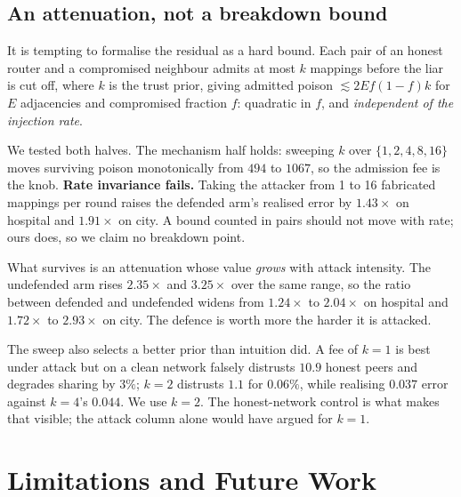 \documentclass[conference,a4paper]{IEEEtran}
\begin{document}
\subsection{An attenuation, not a breakdown bound}
\label{sec:threat-attenuation}

It is tempting to formalise the residual as a hard bound. Each pair of an
honest router and a compromised neighbour admits at most $k$ mappings before
the liar is cut off, where $k$ is the trust prior, giving admitted poison
$\lesssim 2Ef(1-f)k$ for $E$ adjacencies and compromised fraction $f$:
quadratic in $f$, and \emph{independent of the injection rate}.

We tested both halves. The mechanism half holds: sweeping $k$ over
$\{1,2,4,8,16\}$ moves surviving poison monotonically from $494$ to $1067$,
so the admission fee is the knob. \textbf{Rate invariance fails.} Taking the
attacker from 1 to 16 fabricated mappings per round raises the defended arm's
realised error by $1.43\times$ on hospital and $1.91\times$ on city. A bound
counted in pairs should not move with rate; ours does, so we claim no
breakdown point.

What survives is an attenuation whose value \emph{grows} with attack
intensity. The undefended arm rises $2.35\times$ and $3.25\times$ over the
same range, so the ratio between defended and undefended widens from
$1.24\times$ to $2.04\times$ on hospital and $1.72\times$ to $2.93\times$ on
city. The defence is worth more the harder it is attacked.

The sweep also selects a better prior than intuition did. A fee of $k=1$ is
best under attack but on a clean network falsely distrusts $10.9$ honest
peers and degrades sharing by $3\%$; $k=2$ distrusts $1.1$ for $0.06\%$,
while realising $0.037$ error against $k=4$'s $0.044$. We use $k=2$. The
honest-network control is what makes that visible; the attack column alone
would have argued for $k=1$.

\balance

\section{Limitations and Future Work}
\label{sec:limits}
\end{document}
